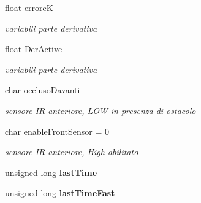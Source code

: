 \begin{DoxyCompactItemize}
\mbox{\label{ari_pi__2_d_c__esp__08_8ino_a43bf1698c167f19ec1563cb37355ca7a}} 
float \mbox{\hyperlink{ari_pi__2_d_c__esp__08_8ino_a43bf1698c167f19ec1563cb37355ca7a}{errore\+K\+\_}}
\begin{DoxyCompactList}\small\item\em variabili parte derivativa \end{DoxyCompactList}\item 
\mbox{\label{ari_pi__2_d_c__esp__08_8ino_abed78639ba3e8d1c1fabb1c684c02409}} 
float \mbox{\hyperlink{ari_pi__2_d_c__esp__08_8ino_abed78639ba3e8d1c1fabb1c684c02409}{Der\+Active}}
\begin{DoxyCompactList}\small\item\em variabili parte derivativa \end{DoxyCompactList}\item 
\mbox{\label{ari_pi__2_d_c__esp__08_8ino_a6cf81e85cd1dfe1a8f1fffbb474a3aea}} 
char \mbox{\hyperlink{ari_pi__2_d_c__esp__08_8ino_a6cf81e85cd1dfe1a8f1fffbb474a3aea}{occluso\+Davanti}}
\begin{DoxyCompactList}\small\item\em sensore IR anteriore, L\+OW in presenza di ostacolo \end{DoxyCompactList}\item 
\mbox{\label{ari_pi__2_d_c__esp__08_8ino_a1265c7245a99fb5e33ccbcf68e058548}} 
char \mbox{\hyperlink{ari_pi__2_d_c__esp__08_8ino_a1265c7245a99fb5e33ccbcf68e058548}{enable\+Front\+Sensor}} = 0
\begin{DoxyCompactList}\small\item\em sensore IR anteriore, High abilitato \end{DoxyCompactList}\item 
\mbox{\label{ari_pi__2_d_c__esp__08_8ino_a22cb446e5271d5d2c4b2e23792fb1966}} 
unsigned long {\bfseries last\+Time}
\item 
\mbox{\label{ari_pi__2_d_c__esp__08_8ino_a952f8b93b7670156479bc642b5af6ab8}} 
unsigned long {\bfseries last\+Time\+Fast}
\item 
\mbox{\label{ari_pi__2_d_c__esp__08_8ino_a458b4f86617930d87d3a7540cd482f64}} 

\end{DoxyCompactItemize}

